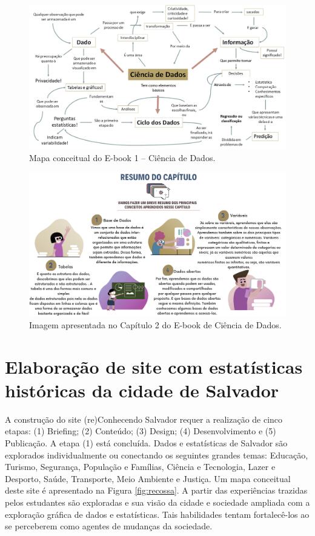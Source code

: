 \documentclass[
]{book}
\begin{document}
\begin{figure}
\includegraphics[width=18.07in]{images/image115} \caption{Mapa conceitual do E-book 1 – Ciência de Dados.}\label{fig:ebookcd}
\end{figure}

\begin{figure}
\includegraphics[width=18.97in]{images/image116} \caption{Imagem apresentada no Capítulo 2 do E-book de Ciência de Dados.}\label{fig:ebookprotag}
\end{figure}

\hypertarget{elaborauxe7uxe3o-de-site-com-estatuxedsticas-histuxf3ricas-da-cidade-de-salvador}{%
\chapter{Elaboração de site com estatísticas históricas da cidade de Salvador}\label{elaborauxe7uxe3o-de-site-com-estatuxedsticas-histuxf3ricas-da-cidade-de-salvador}}

A construção do site (re)Conhecendo Salvador requer a realização de cinco etapas: (1) Briefing; (2) Conteúdo; (3) Design; (4) Desenvolvimento e (5) Publicação. A etapa (1) está concluída. Dados e estatísticas de Salvador são explorados individualmente ou conectando os seguintes grandes temas: Educação, Turismo, Segurança, População e Famílias, Ciência e Tecnologia, Lazer e Desporto, Saúde, Transporte, Meio Ambiente e Justiça. Um mapa conceitual deste site é apresentado na Figura \ref{fig:recossa}. A partir das experiências trazidas pelos estudantes são exploradas e sua visão da cidade e sociedade ampliada com a exploração gráfica de dados e estatísticas. Tais habilidades tentam fortalecê-los ao se perceberem como agentes de mudanças da sociedade.
\end{document}
